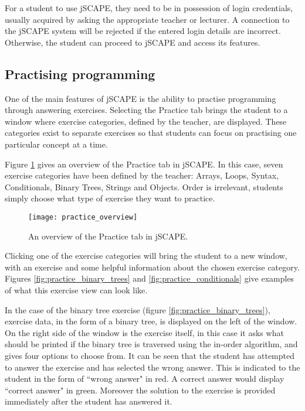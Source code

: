 For a student to use jSCAPE, they need to be in possession of login credentials, usually acquired by asking the appropriate teacher or lecturer. A connection to the jSCAPE system will be rejected if the entered login details are incorrect. Otherwise, the student can proceed to jSCAPE and access its features.

\subsection{Practising programming}
\label{subsec:pratising-programming}
One of the main features of jSCAPE is the ability to practise programming through answering exercises. Selecting the Practice tab brings the student to a window where exercise categories, defined by the teacher, are displayed. These categories exist to separate exercises so that students can focus on practising one particular concept at a time. \newline

Figure \ref{fig:practice_overview} gives an overview of the Practice tab in jSCAPE. In this case, seven exercise categories have been defined by the teacher: Arrays, Loops, Syntax, Conditionals, Binary Trees, Strings and Objects. Order is irrelevant, students simply choose what type of exercise they want to practice.

\begin{figure}[H]
\centering
\texttt{[image: practice\_overview]}
\caption{An overview of the Practice tab in jSCAPE.}
\label{fig:practice_overview}
\end{figure}

Clicking one of the exercise categories will bring the student to a new window, with an exercise and some helpful information about the chosen exercise category.
Figures \ref{fig:practice_binary_trees} and \ref{fig:practice_conditionals} give examples of what this exercise view can look like.\newline

In the case of the binary tree exercise (figure \ref{fig:practice_binary_trees}), exercise data, in the form of a binary tree, is displayed on the left of the window. On the right side of the window is the exercise itself, in this case it asks what should be printed if the binary tree is traversed using the in-order algorithm, and gives four options to choose from. It can be seen that the student has attempted to answer the exercise and has selected the wrong answer. This is indicated to the student in the form of ``wrong answer" in red. A correct answer would display ``correct answer" in green. Moreover the solution to the exercise is provided immediately after the student has answered it.

